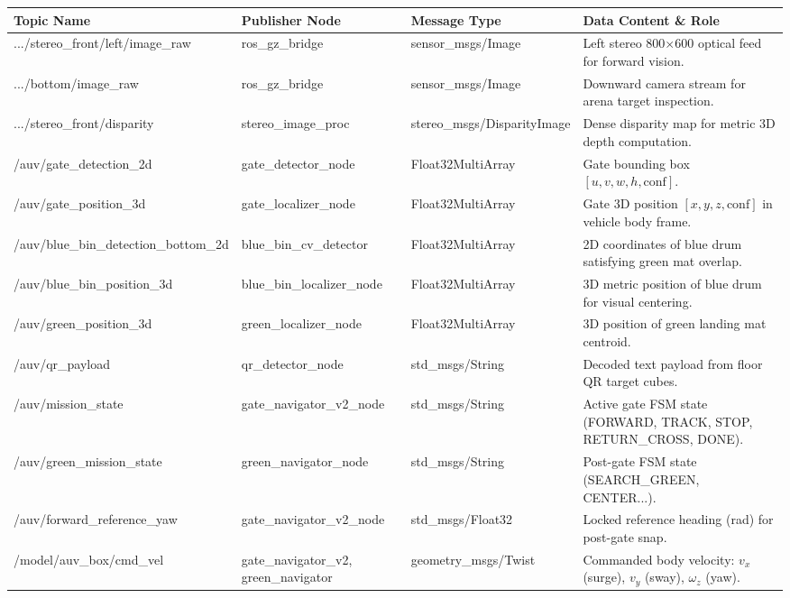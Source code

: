 \documentclass[10.5pt,a4paper]{article}
\begin{document}
\begin{table}[H]\centering\scriptsize
\begin{tabularx}{\textwidth}{L{4.4cm} L{2.6cm} L{3.0cm} X}
\toprule
{}\textbf{Topic Name} & \textbf{Publisher Node} & \textbf{Message Type} & \textbf{Data Content \& Role} \\
\midrule
\ttfamily .../stereo\_front/left/image\_raw & ros\_gz\_bridge & sensor\_msgs/Image & Left stereo 800$\times$600 optical feed for forward vision. \\
\ttfamily .../bottom/image\_raw & ros\_gz\_bridge & sensor\_msgs/Image & Downward camera stream for arena target inspection. \\
\ttfamily .../stereo\_front/disparity & stereo\_image\_proc & stereo\_msgs/DisparityImage & Dense disparity map for metric 3D depth computation. \\
\ttfamily /auv/gate\_detection\_2d & gate\_detector\_node & Float32MultiArray & Gate bounding box $[u,v,w,h,\text{conf}]$. \\
\ttfamily /auv/gate\_position\_3d & gate\_localizer\_node & Float32MultiArray & Gate 3D position $[x,y,z,\text{conf}]$ in vehicle body frame. \\
\ttfamily /auv/blue\_bin\_detection\_\newline bottom\_2d & blue\_bin\_cv\_detector & Float32MultiArray & 2D coordinates of blue drum satisfying green mat overlap. \\
\ttfamily /auv/blue\_bin\_position\_3d & blue\_bin\_localizer\_node & Float32MultiArray & 3D metric position of blue drum for visual centering. \\
\ttfamily /auv/green\_position\_3d & green\_localizer\_node & Float32MultiArray & 3D position of green landing mat centroid. \\
\ttfamily /auv/qr\_payload & qr\_detector\_node & std\_msgs/String & Decoded text payload from floor QR target cubes. \\
\ttfamily /auv/mission\_state & gate\_navigator\_v2\_node & std\_msgs/String & Active gate FSM state (FORWARD, TRACK, STOP, RETURN\_CROSS, DONE). \\
\ttfamily /auv/green\_mission\_state & green\_navigator\_node & std\_msgs/String & Post-gate FSM state (SEARCH\_GREEN, CENTER...). \\
\ttfamily /auv/forward\_reference\_yaw & gate\_navigator\_v2\_node & std\_msgs/Float32 & Locked reference heading (rad) for post-gate snap. \\
\ttfamily /model/auv\_box/cmd\_vel & gate\_navigator\_v2, green\_navigator & geometry\_msgs/Twist & Commanded body velocity: $v_x$ (surge), $v_y$ (sway), $\omega_z$ (yaw). \\

\end{tabularx}
\end{table}
\end{document}
